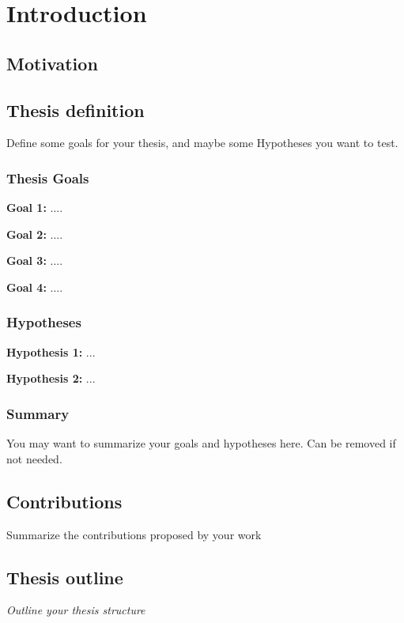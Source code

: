 \documentclass{uia}
\begin{document}
\chapter{Introduction}
\section{Motivation}

\section{Thesis definition}
\label{sec:intro:definition}
Define some goals for your thesis, and maybe some Hypotheses you want to test.
\subsection{Thesis Goals}

\textbf{Goal 1: } ....

\textbf{Goal 2: } ....

\textbf{Goal 3: } ....

\textbf{Goal 4: } ....

\subsection{Hypotheses}

\textbf{Hypothesis 1: } ...

\textbf{Hypothesis 2: } ...

\subsection{Summary}
You may want to summarize your goals and hypotheses here. Can be removed if not needed.

\section{Contributions}
Summarize the contributions proposed by your work 

\section{Thesis outline}
\textit{Outline your thesis structure}
\end{document}
